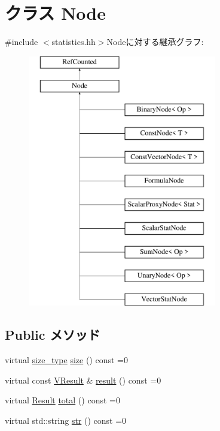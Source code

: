 \hypertarget{classStats_1_1Node}{
\section{クラス Node}
\label{classStats_1_1Node}
}


{\ttfamily \#include $<$statistics.hh$>$}Nodeに対する継承グラフ:\begin{figure}[H]
\begin{center}
\leavevmode
\includegraphics[height=11cm]{classStats_1_1Node}
\end{center}
\end{figure}
\subsection*{Public メソッド}
\begin{DoxyCompactItemize}
\item 
virtual \hyperlink{namespaceStats_ada51e68d31936547d3729c82daf6b7c6}{size\_\-type} \hyperlink{classStats_1_1Node_a4051d143efd31726fa13df03ae4e1bce}{size} () const =0
\item 
virtual const \hyperlink{classstd_1_1vector}{VResult} \& \hyperlink{classStats_1_1Node_a7fcf57115122663db42f39cc18ca0f62}{result} () const =0
\item 
virtual \hyperlink{namespaceStats_ad874d2cfd4b4a29ebd480bb2e67f20ae}{Result} \hyperlink{classStats_1_1Node_ab152b7e89b37a7db03b04d500ceb8349}{total} () const =0
\item 
virtual std::string \hyperlink{classStats_1_1Node_a6522bc65bd97a6b1ef6cdfe78462a919}{str} () const =0
\end{DoxyCompactItemize}


